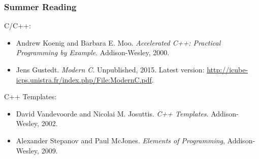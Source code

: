 \begin{frame}

\frametitle{Summer Reading}

\footnotesize

C/C++:

\begin{itemize}

\item Andrew Koenig and Barbara E. Moo. \emph{Accelerated C++: Practical
Programming by Example}. Addison-Wesley, 2000.

\item Jens Gustedt. \emph{Modern C}. Unpublished, 2015. Latest version:
\url{http://icube-icps.unistra.fr/index.php/File:ModernC.pdf}.

\end{itemize}

C++ Templates:

\begin{itemize}

\item David Vandevoorde and Nicolai M. Josuttis. \emph{C++ Templates}.
Addison-Wesley, 2002.

\item Alexander Stepanov and Paul McJones. \emph{Elements of Programming},
Addison-Wesley, 2009.

\end{itemize}

\end{frame}

